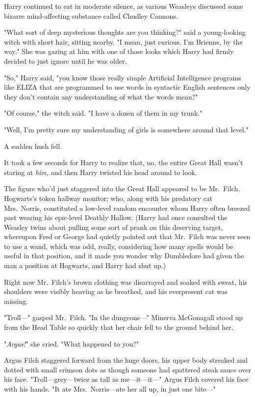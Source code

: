 Harry continued to eat in moderate silence, as various Weasleys discussed some bizarre mind-affecting substance called Chudley Cannons.

"What sort of deep mysterious thoughts are you thinking?" said a young-looking witch with short hair, sitting nearby. "I mean, just curious. I'm Brienne, by the way." She was gazing at him with one of those looks which Harry had firmly decided to just ignore until he was older.

"So," Harry said, "you know those really simple Artificial Intelligence programs like ELIZA that are programmed to use words in syntactic English sentences only they don't contain any understanding of what the words mean?"

"Of course," the witch said. "I have a dozen of them in my trunk."

"Well, I'm pretty sure my understanding of girls is somewhere around that level."

A sudden hush fell.

It took a few seconds for Harry to realize that, no, the entire Great Hall wasn't staring at \emph{him,} and then Harry twisted his head around to look.

The figure who'd just staggered into the Great Hall appeared to be Mr.~Filch, Hogwarts's token hallway monitor; who, along with his predatory cat Mrs.~Norris, constituted a low-level random encounter whom Harry often breezed past wearing his epic-level Deathly Hallow. (Harry had once consulted the Weasley twins about pulling some sort of prank on this deserving target, whereupon Fred or George had quietly pointed out that Mr.~Filch was never seen to use a wand, which was odd, really, considering how many spells would be useful in that position, and it made you wonder why Dumbledore had given the man a position at Hogwarts, and Harry had shut up.)

Right now Mr.~Filch's brown clothing was disarrayed and soaked with sweat, his shoulders were visibly heaving as he breathed, and his everpresent cat was missing.

"Troll---" gasped Mr.~Filch. "In the dungeons---"
\sbreak
Minerva McGonagall stood up from the Head Table so quickly that her chair fell to the ground behind her.

"\emph{Argus!}" she cried. "What happened to you?"

Argus Filch staggered forward from the huge doors, his upper body streaked and dotted with small crimson dots as though someone had spattered steak sauce over his face. "Troll---grey---twice as tall as me---it---it---" Argus Filch covered his face with his hands. "It ate Mrs.~Norris---ate her all up, in just one bite---"

